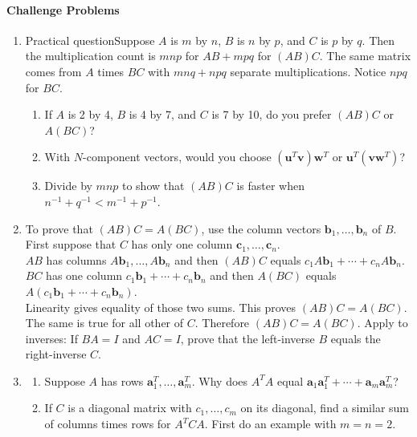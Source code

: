 \documentclass[14pt, a4paper]{article}
\begin{document}
\paragraph{Challenge Problems}
\begin{enumerate}[resume]
    \item Practical question\quad Suppose $A$ is $m$ by $n$, $B$ is $n$ by $p$, and $C$ is $p$ by $q$. Then the multiplication count is $mnp$ for $AB + mpq$ for $(AB)C$. The same matrix comes from $A$ times $BC$ with $mnq + npq$ separate multiplications. Notice $npq$ for $BC$.
          \begin{enumerate}
              \item If $A$ is 2 by 4, $B$ is 4 by 7, and $C$ is 7 by 10, do you prefer $(AB)C$ or $A(BC)$?
              \item With $N$-component vectors, would you choose $(\boldsymbol{u}^T\boldsymbol{v})\boldsymbol{w}^T$ or $\boldsymbol{u}^T(\boldsymbol{v}\boldsymbol{w}^T)$?
              \item Divide by $mnp$ to show that $(AB)C$ is faster when $n^{-1} + q^{-1} < m^{-1} + p^{-1}$.
          \end{enumerate}

    \item To prove that $(AB)C = A(BC)$, use the column vectors $\boldsymbol{b}_1,\dots,\boldsymbol{b}_n$ of $B$. First suppose that $C$ has only one column $\boldsymbol{c}_1,\dots,\boldsymbol{c}_n$. \\
          $AB$ has columns $A\boldsymbol{b}_1,\dots,A\boldsymbol{b}_n$ and then $(AB)C$ equals $c_1A\boldsymbol{b}_1+\cdots+c_nA\boldsymbol{b}_n$. \\
          $BC$ has one column $c_1\boldsymbol{b}_1+\cdots+c_n\boldsymbol{b}_n$ and then $A(BC)$ equals $A(c_1\boldsymbol{b}_1+\cdots+c_n\boldsymbol{b}_n)$. \\
          Linearity gives equality of those two sums. This proves $(AB)C = A(BC)$. The same is true for all other \underline{\hspace{3em}} of $C$. Therefore $(AB)C = A(BC)$. Apply to inverses: If $BA = I$ and $AC = I$, prove that the left-inverse $B$ equals the right-inverse $C$.

    \item
          \begin{enumerate}
              \item Suppose $A$ has rows $\boldsymbol{a}_1^T,\dots,\boldsymbol{a}_m^T$. Why does $A^TA$ equal $\boldsymbol{a}_1\boldsymbol{a}_1^T + \cdots + \boldsymbol{a}_m\boldsymbol{a}_m^T$?
              \item If $C$ is a diagonal matrix with $c_1,\dots,c_m$ on its diagonal, find a similar sum of columns times rows for $A^TCA$. First do an example with $m = n = 2$.
          \end{enumerate}
\end{enumerate}
\end{document}
